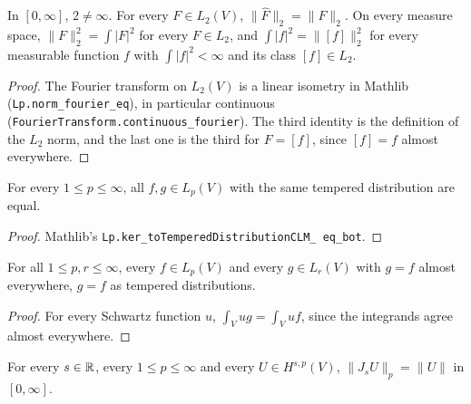 \begin{lemma}
\label{lem:plancherel-l2}
\leanok
In $[0, \infty]$, $2 \neq \infty$. For every $F \in L_2(V)$, $\|\widehat F\|_2 = \|F\|_2$. On
every measure space, $\|F\|_2^2 = \int |F|^2$ for every $F \in L_2$, and
$\int |f|^2 = \|[f]\|_2^2$ for every measurable function $f$ with $\int |f|^2 < \infty$ and its
class $[f] \in L_2$.
\end{lemma}

\begin{proof}
\leanok
The Fourier transform on $L_2(V)$ is a linear isometry in Mathlib
(\texttt{Lp.\allowbreak norm\_\allowbreak fourier\_\allowbreak eq}), in particular continuous
(\texttt{FourierTransform.\allowbreak continuous\_\allowbreak fourier}). The third identity is
the definition of the $L_2$ norm, and the last one is the third for $F = [f]$, since $[f] = f$
almost everywhere.
\end{proof}

\begin{lemma}
\label{lem:lp-distribution-determined}
\leanok
For every $1 \leq p \leq \infty$, all $f, g \in L_p(V)$ with the same tempered distribution are
equal.
\end{lemma}

\begin{proof}
\leanok
Mathlib's \texttt{Lp.\allowbreak ker\_\allowbreak toTemperedDistributionCLM\_\allowbreak
eq\_\allowbreak bot}.
\end{proof}

\begin{lemma}
\label{lem:ae-equal-classes-distribution}
\leanok
For all $1 \leq p, r \leq \infty$, every $f \in L_p(V)$ and every $g \in L_r(V)$ with $g = f$
almost everywhere, $g = f$ as tempered distributions.
\end{lemma}

\begin{proof}
\leanok
For every Schwartz function $u$, $\int_V u g = \int_V u f$, since the integrands agree almost
everywhere.
\end{proof}

\begin{lemma}
\label{lem:bessel-space-enorm}
\leanok
For every $s \in \mathbb{R}$, every $1 \leq p \leq \infty$ and every $U \in H^{s,p}(V)$,
$\|J_s U\|_p = \|U\|$ in $[0, \infty]$.
\end{lemma}

